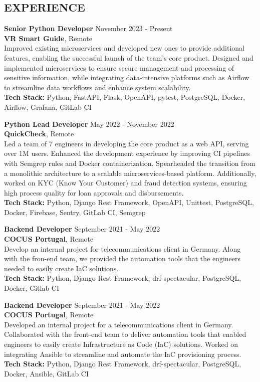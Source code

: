 \documentclass[margin, 10pt]{res} %
\begin{document}
\begin{resume}
    \section{EXPERIENCE}


    \textbf{Senior Python Developer} \hfill November 2023 - Present\\
    \textbf{VR Smart Guide}, Remote\\
    Improved existing microservices and developed new ones to provide additional features, enabling the successful launch of the team's core product. Designed and implemented microservices to ensure secure management and processing of sensitive information, while integrating data-intensive platforms such as Airflow to streamline data workflows and enhance system scalability.\\
    \textbf{Tech Stack:} Python, FastAPI, Flask, OpenAPI, pytest, PostgreSQL, Docker, Airflow, Grafana, GitLab CI

    \textbf{Python Lead Developer} \hfill May 2022 - November 2022\\
    \textbf{QuickCheck}, Remote\\
    Led a team of 7 engineers in developing the core product as a web API, serving over 1M users. Enhanced the development experience by improving CI pipelines with Semgrep rules and Docker containerization. Spearheaded the transition from a monolithic architecture to a scalable microservices-based platform. Additionally, worked on KYC (Know Your Customer) and fraud detection systems, ensuring high process quality for loan approvals and disbursements.\\
    \textbf{Tech Stack:} Python, Django Rest Framework, OpenAPI, Unittest, PostgreSQL, Docker, Firebase, Sentry, GitLab CI, Semgrep


    \textbf{Backend Developer} \hfill September 2021 - May 2022\\
    \textbf{COCUS Portugal}, Remote\\
    Develop an internal project for telecommunications client in Germany. Along with the fron-end team, we provided the automation tools that the engineers needed to easily create IaC solutions.\\
    \textbf {Tech Stack:} Python, Django Rest Framework, drf-spectacular, PostgreSQL, Docker, Gitlab CI


    \textbf{Backend Developer} \hfill September 2021 - May 2022\\
    \textbf{COCUS Portugal}, Remote\\
    Developed an internal project for a telecommunications client in Germany. Collaborated with the front-end team to deliver automation tools that enabled engineers to easily create Infrastructure as Code (IaC) solutions. Worked on integrating Ansible to streamline and automate the IaC provisioning process.\\
    \textbf{Tech Stack:} Python, Django Rest Framework, drf-spectacular, PostgreSQL, Docker, Ansible, GitLab CI



\end{resume}
\end{document}
